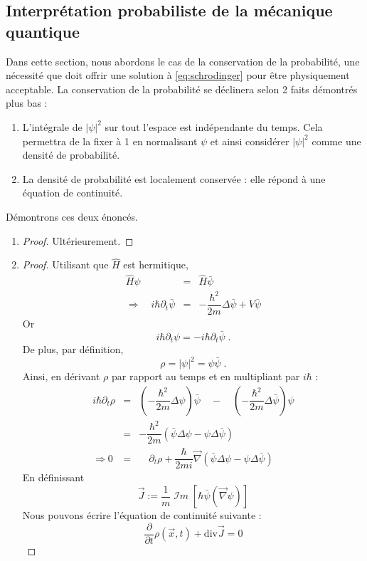 \documentclass[12pt, a4paper]{book}
\begin{document}
\subsection{Interprétation probabiliste de la mécanique quantique}
Dans cette section, nous abordons le cas de la conservation de la probabilité, une nécessité que doit offrir une solution à \eqref{eq:schrodinger} pour être physiquement acceptable. La conservation de la probabilité se déclinera selon 2 faits démontrés plus bas :
\begin{enumerate}[label= (\alph*)]
\item L'intégrale de $|\psi|^2$ sur tout l'espace est indépendante du temps. Cela permettra de la fixer à 1 en normalisant $\psi$ et ainsi considérer $|\psi|^2$ comme une densité de probabilité.
\item La densité de probabilité est localement conservée : elle répond à une équation de continuité. \\
\end{enumerate}
Démontrons ces deux énoncés.
\begin{enumerate}[label= (\alph*)]
\item \begin{proof}
Ultérieurement.
\end{proof}
\item \begin{proof}
Utilisant que $\hat{H}$ est hermitique,
\begin{eqnarray*}
\hat{H}\psi &=& \hat{H} \bar{\psi} \\
 \Rightarrow \quad i\hbar \partial_t \bar{\psi} &=& -\dfrac{\hbar^2}{2m} \Delta \bar{\psi}+ V \bar{\psi} 
\end{eqnarray*}
Or $$i\hbar \partial_t \psi = -i\hbar \partial_t \bar{\psi} \; .$$
De plus, par définition, 
$$\rho = |\psi|^2 = \psi \bar{\psi} \; .$$
Ainsi, en dérivant $\rho$ par rapport au temps et en multipliant par $i\hbar$ :
\begin{eqnarray*}
i\hbar \partial_t \rho &=& \left(-\dfrac{\hbar^2}{2m} \Delta \psi\right) \bar{\psi} \quad - \quad \left(-\dfrac{\hbar^2}{2m} \Delta \bar{\psi}\right)\psi \\
&=& -\dfrac{\hbar^2}{2m} \left( \bar{\psi} \Delta \psi - \psi \Delta \bar{\psi} \right) \\
\Rightarrow 0 &=& \quad \partial_t \rho + \dfrac{\hbar}{2mi} \vec \nabla \left( \bar{\psi} \Delta \psi - \psi \Delta \bar{\psi} \right) 
\end{eqnarray*}
En définissant 
\begin{equation} \label{eq:courant_proba}
\vec J := \dfrac{1}{m} \; \mathcal{I}m \;\left[\hbar \bar{\psi}(\vec \nabla \psi)\right] 
\end{equation} 
Nous pouvons écrire l'équation de continuité suivante :
\begin{equation} \label{eq:continuite_proba}
\boxed{\dfrac{\partial}{\partial t} \rho(\vec x, t) + \mathrm{div} \vec J = 0}
\end{equation}
\end{proof}\end{enumerate}
\end{document}
